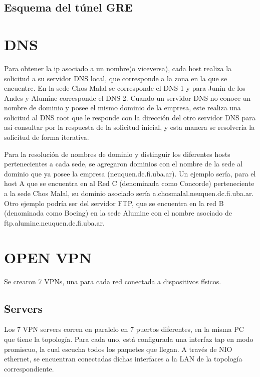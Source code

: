\documentclass[12pt, a4paper, spanish]{article}
\begin{document}
{\small
\begin{verbatim}

\end{verbatim}
}

\subsection{Esquema del túnel GRE}

\newpage


\newpage
\section{DNS}
Para obtener la ip asociado a un nombre(o viceversa), cada host realiza 
la solicitud a su servidor DNS local, que corresponde a la zona en la que 
se encuentre.
En la sede Chos Malal se corresponde el DNS 1 y para Junín de los Andes y 
Alumine corresponde el DNS 2.
Cuando un servidor DNS no conoce un nombre de dominio y posee el mismo 
dominio de la empresa, este realiza una solicitud al DNS root que le responde 
con la dirección del otro servidor DNS para así consultar por la respuesta de 
la solicitud inicial, y esta manera se resolvería la solicitud de forma 
iterativa.

Para la resolución de nombres de dominio y distinguir los diferentes hosts 
pertenecientes a cada sede, se agregaron dominios con el nombre de la sede 
al dominio que ya posee la empresa (neuquen.dc.fi.uba.ar).
Un ejemplo sería, para el host A que se encuentra en al Red C (denominada 
como Concorde) perteneciente a la sede Chos Malal, su dominio asociado sería 
a.chosmalal.neuquen.dc.fi.uba.ar.
Otro ejemplo podría ser del servidor FTP, que se encuentra en la red B 
(denominada como Boeing) en la sede Alumine con el nombre asociado de 
ftp.alumine.neuquen.dc.fi.uba.ar.

\section{OPEN VPN}
Se crearon 7 VPNs, una para cada red conectada a dispositivos físicos.

\subsection{Servers}
Los 7 VPN servers corren en paralelo en 7 puertos diferentes, en la misma PC 
que tiene la topología.
Para cada uno, está configurada una interfaz tap en modo promiscuo, la cual 
escucha todos los paquetes que llegan.
A través de NIO ethernet, se encuentran conectadas dichas interfaces a la LAN 
de la topología correspondiente.
\end{document}
